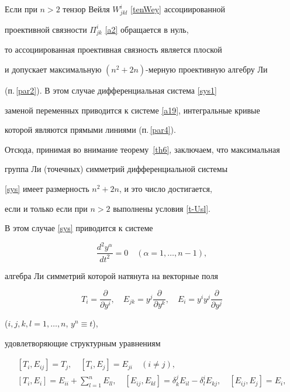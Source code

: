 Если при $n>2$ тензор Вейля $W^i_{jkl}$ \eqref{tenWey} ассоциированной


проективной связности $\Pi^i_{jk}$ \eqref{a2} обращается в нуль,


то ассоциированная проективная связность является плоской


и допускает максимальную $(n^2+2n)$-мерную проективную алгебру Ли


(п.\,\ref{par2}). В этом случае дифференциальная система \eqref{sys1}


заменой переменных приводится к системе \eqref{a19}, интегральные кривые


которой являются прямыми линиями (п.\,\ref{par4}).


Отсюда, принимая во внимание теорему~\ref{th6}, заключаем, что максимальная 


группа Ли (точечных) симметрий дифференциальной системы


\eqref{sys} имеет размерность $n^2+2n$, и это число достигается,


если и только если при $n>2$ выполнены условия \eqref{t-Usl}.


В этом случае \eqref{sys} приводится к системе


$$


\frac{d^2y^\alpha}{dt^2}=0


\quad (\alpha=1,\dotsc,n-1),


$$


алгебра Ли симметрий которой натянута на векторные поля


$$


T_i=\frac{\partial}{\partial y^i},\quad


E_{jk}=y^j\frac{\partial}{\partial y^k},\quad


E_i=y^iy^j\frac{\partial}{\partial y^j}


$$


($i,j,k,l=1,\dotsc,n$, $y^n\equiv t$),


удовлетворяющие структурным уравнениям


\begin{gather*}


[T_i,E_{ij}]=T_j,\quad 


[T_i,E_j]=E_{ji}\quad (i\neq j),\\


%


[T_i,E_i]=E_{ii}+\sum^{n}_{l=1}E_{ll},\quad


[E_{ij},E_{kl}]=\delta ^j_k E_{il}-


\delta^i_l E_{kj}, \quad


[E_{ij},E_j]=E_i,


\end{gather*}


